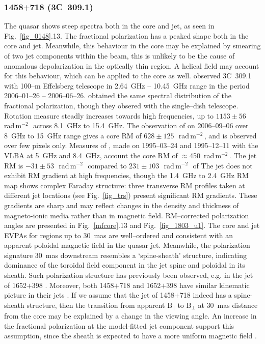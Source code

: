 \documentclass[a4paper,fleqn,usenatbib,useAMS]{mnras}
\newcommand{\rmu}{\,rad\,m$^{-2}$\,} %
\begin{document}
\subsubsection{1458$+$718 (3C~309.1)}
The quasar shows steep spectra both in the core and jet, as seen in Fig.~\ref{fig_0148}.13. 
The fractional polarization has a peaked shape both in the core and jet. 
Meanwhile, this behaviour in the core may be explained by smearing of two jet components within the beam, this is unlikely to be the cause of anomalous depolarization in the optically thin region. 
A helical field may account for this behaviour, which can be applied to the core as well.
\citet{2009AA...502...61M} observed 3C~309.1 with 100--m Effelsberg telescope in 2.64~GHz -- 10.45~GHz range in the period 2006--01--26 -- 2006--06--26. \citeauthor{2009AA...502...61M} obtained the same spectral distribution of the fractional polarization, though they obsered with the single--dish telescope.
Rotation measure steadly increases towards high frequencies, up to $1153\pm56$~\rmu\ across 8.1~GHz to 15.4~GHz.
The observation of \citet{hovatta_etal12} on 2006--09--06 over 8~GHz to 15~GHz range gives a core RM of $628\pm125$~\rmu, and is observed over few pixels only.
Measures of \citet{1997VA.....41..225A}, made on 1995--03--24 and 1995--12--11 with the VLBA at 5~GHz and 8.4~GHz, account the core RM of $\approx$450 \rmu.
The jet RM is $-31\pm53$~\rmu\ compared to $231\pm103$~\rmu\ of \citeauthor{hovatta_etal12}
The jet does not exhibit RM gradient at high frequencies, though the 1.4~GHz to 2.4~GHz RM map shows complex Faraday structure: three transverse RM profiles taken at different jet locations (see Fig.~\ref{fig_trs}) present significant RM gradients. 
These gradients are sharp and may reflect changes in the density and thickness of magneto-ionic media rather than in magnetic field.
RM--corrected polarization angles are presented in Fig.~\ref{mfcore}.13 and Fig.~\ref{fig_1803_u1}.
The core and jet EVPAs for regions up to 30~mas are well--ordered and consistent with an apparent poloidal magnetic field in the quasar jet.
Meanwhile, the polarization signature 30~mas downstream resembles a `spine-sheath' structure, indicating dominance of the toroidal field component in the jet spine and poloidal in its sheath.
Such polarization structure has previously been observed, e.g. in the jet of 1652$+$398 \citep[Mrk~501,][]{2005MNRAS.356..859P}. 
Moreover, both 1458$+$718 and 1652$+$398 have similar kinematic picture in their jets \citep{2016AJ....152...12L}.
If we assume that the jet of 1458$+$718 indeed has a spine-sheath structure, then the transition from apparent $\mathrm{B}_{\parallel}$ to $\mathrm{B}_{\perp}$ at 30~mas distance from the core may be explained by a change in the viewing angle.
An increase in the fractional polarization at the model-fitted jet component support this assumption, since the sheath is expected to have a more uniform magnetic field \citep{lyutikov_etal05}.
\end{document}
